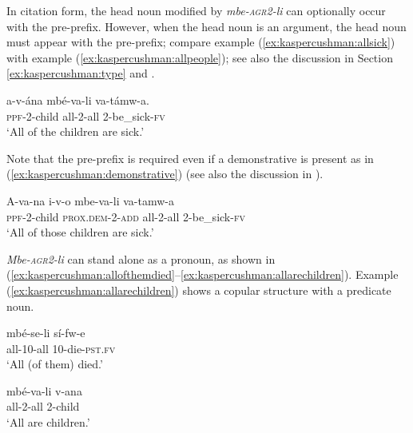 \documentclass[output=paper,modfonts,nonflat]{langsci/langscibook}
\begin{document}
In citation form, the head noun modified by \textit{mbe-\textsc{agr2}-li} can optionally occur with the pre-prefix.  However, when the head noun is an argument, the head noun must appear with the pre-prefix; compare example (\ref{ex:kaspercushman:allsick}) with example (\ref{ex:kaspercushman:allpeople}); see also the discussion in Section \ref{ex:kaspercushman:type} and \citealt{gambarage16}. 
 
\begin{exe}
\ex 
\gll a-v-ána mbé-va-li va-támw-a. \\
\textsc{ppf}-2-child all-2-all 2-be\_sick-\textsc{fv} \\
\glt `All of the children are sick.' \\ \label{ex:kaspercushman:allsick}
\end{exe}

Note that the pre-prefix is required even if a demonstrative is present as in (\ref{ex:kaspercushman:demonstrative}) (see also the discussion in \citealt[32--33]{Matthewson2013}). 
\begin{exe}

\ex \label{ex:kaspercushman:demonstrative}
\gll A-va-na i-v-o mbe-va-li va-tamw-a \\
\textsc{ppf}-2-child \textsc{prox.dem}-2-\textsc{add} all-2-all 2-be\_sick-\textsc{fv} \\
\glt `All of those children are sick.' \\
\end{exe}


\textit{Mbe-\textsc{agr2}-li} can stand alone as a pronoun, as shown in (\ref{ex:kaspercushman:allofthemdied}--\ref{ex:kaspercushman:allarechildren}).  Example (\ref{ex:kaspercushman:allarechildren}) shows a copular structure with a predicate noun. 

\begin{exe}
\ex \label{ex:kaspercushman:allofthemdied} 
\gll mbé-se-li sí-fw-e \\ 
all-10-all 10-die-\textsc{pst}.\textsc{fv} \\
\glt `All (of them) died.' 

\end{exe}

\begin{exe}
\ex \label{ex:kaspercushman:allarechildren} 
\gll mbé-va-li v-ana \\
all-2-all 2-child \\
\glt `All are children.'
\end{exe}
\end{document}
